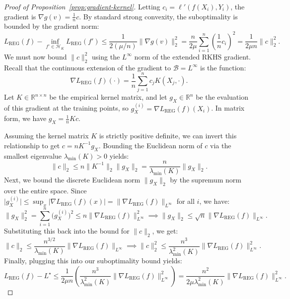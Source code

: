 \documentclass{article}
\newcommand{\R}{\mathbb{R}}
\begin{document}
\begin{proof}[Proof of Proposition~\ref{prop:gradient-kernel}]
    Letting $c_i = \ell'(f(X_i), Y_i)$, the gradient is $\nabla g(v) = \frac{1}{n} c$. By standard strong convexity, the suboptimality is bounded by the gradient norm:
    \[ L_\mathrm{REG}(f) - \inf_{f' \in \mathcal{H}_K} L_\mathrm{REG}(f') \leq \frac{1}{2(\mu/n)} \lVert \nabla g(v) \rVert_2^2 = \frac{n}{2\mu} \sum_{i=1}^n \left( \frac{1}{n} c_i \right)^2 = \frac{1}{2\mu n} \lVert c \rVert_2^2. \]
    We must now bound $\lVert c \rVert_2^2$ using the $L^\infty$ norm of the extended RKHS gradient. Recall that the continuous extension of the gradient to $\mathcal{B} = L^\infty$ is the function:
    \[ \nabla L_\mathrm{REG}(f)(\cdot) = \frac{1}{n} \sum_{j=1}^n c_j K(X_j, \cdot). \]
    Let $K \in \R^{n \times n}$ be the empirical kernel matrix, and let $g_X \in \R^n$ be the evaluation of this gradient at the training points, so $g_X^{(i)} = \nabla L_\mathrm{REG}(f)(X_i)$. In matrix form, we have $g_X = \frac{1}{n} K c$.

    Assuming the kernel matrix $K$ is strictly positive definite, we can invert this relationship to get $c = n K^{-1} g_X$. Bounding the Euclidean norm of $c$ via the smallest eigenvalue $\lambda_{\min}(K) > 0$ yields:
    \[ \lVert c \rVert_2 \leq n \lVert K^{-1} \rVert_2 \lVert g_X \rVert_2 = \frac{n}{\lambda_{\min}(K)} \lVert g_X \rVert_2. \]
    Next, we bound the discrete Euclidean norm $\lVert g_X \rVert_2$ by the supremum norm over the entire space. Since $\lvert g_X^{(i)} \rvert \leq \sup_x \lvert \nabla L_\mathrm{REG}(f)(x) \rvert = \lVert \nabla L_\mathrm{REG}(f) \rVert_{L^\infty}$ for all $i$, we have:
    \[ \lVert g_X \rVert_2^2 = \sum_{i=1}^n \bigl( g_X^{(i)} \bigr)^2 \leq n \lVert \nabla L_\mathrm{REG}(f) \rVert_{L^\infty}^2 \implies \lVert g_X \rVert_2 \leq \sqrt{n} \lVert \nabla L_\mathrm{REG}(f) \rVert_{L^\infty}. \]
    Substituting this back into the bound for $\lVert c \rVert_2$, we get:
    \[ \lVert c \rVert_2 \leq \frac{n^{3/2}}{\lambda_{\min}(K)} \lVert \nabla L_\mathrm{REG}(f) \rVert_{L^\infty} \implies \lVert c \rVert_2^2 \leq \frac{n^3}{\lambda_{\min}^2(K)} \lVert \nabla L_\mathrm{REG}(f) \rVert_{L^\infty}^2. \]
    Finally, plugging this into our suboptimality bound yields:
    \[ L_\mathrm{REG}(f) - L^\star \leq \frac{1}{2\mu n} \left( \frac{n^3}{\lambda_{\min}^2(K)} \lVert \nabla L_\mathrm{REG}(f) \rVert_{L^\infty}^2 \right) = \frac{n^2}{2\mu \lambda_{\min}^2(K)} \lVert \nabla L_\mathrm{REG}(f) \rVert_{L^\infty}^2. \]


\end{proof}
\end{document}
